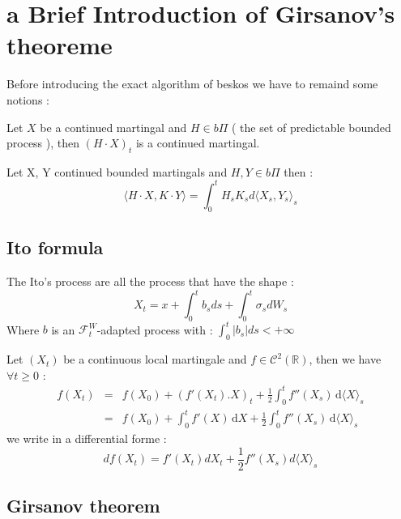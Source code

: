 \section{a Brief Introduction of Girsanov's theoreme}
\label{sec:brief-intr-girs}
Before introducing the exact algorithm of beskos we have to remaind some notions :
\begin{de}

\end{de}

\begin{thm}
\label{int-stoc:1}
  Let  $X$ be  a continued  martingal and  $H \in  b\Pi$ (  the set  of
  predictable bounded process ), then $(H \cdot X)_t$ is a continued martingal.
\end{thm}

\begin{thm}
\label{int-stoc:2}
  Let X, Y continued bounded martingals and $H,Y \in b\Pi$ then :
\[
\langle H  \cdot X , K  \cdot Y \rangle =  \int^t_0 H_s K_s d\langle  X_s, Y_s
\rangle_s
\]
\end{thm}
\subsection{Ito formula}

The Ito's process are all the process that have the shape :
\[
X_t = x + \int_0^{t} b_s ds + \int_0^{t} \sigma_s dW_s
\]
Where $b$  is an $\mathcal{F}^W_t$-adapted process  with : $\int_0^t |b_s|  ds <
+\infty $ 
\begin{prop}
\label{ito}
Let $(X_{t})$ be a continuous local martingale and $f \in \mathcal{C}^{2}(\mathbb{R})$, then we have $\forall t \geq 0$ :
\begin{eqnarray*}
f(X_{t}) & = & f(X_{0})+(f'(X_{t}).X)_{t}+\frac{1}{2}\int_0^t f''(X_{s}) \, \mathrm d\langle X\rangle_s \\
  & = & f(X_{0})+\int_0^t f'(X) \, \mathrm dX +\frac{1}{2}\int_0^t f''(X_{s}) \, \mathrm d\langle X\rangle_s 
\end{eqnarray*}
we write in a differential forme : 
\begin{equation*}
 df(X_{t})=f'(X_{t}) dX_{t} + \frac{1}{2} f''(X_{s}) d\langle X\rangle_s
\end{equation*}
\label{ito}
\end{prop}

\subsection{Girsanov theorem}

